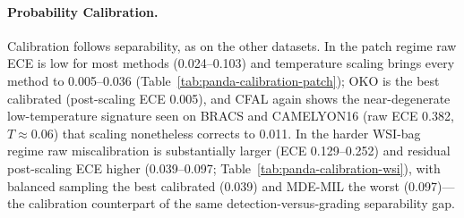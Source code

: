 \documentclass[11pt]{article}
\begin{document}
\begin{table}[ht]
  \centering
  \caption{PANDA native WSI-bag test results (slide-level six-class ISUP grading) for validation-selected configurations, mean $\pm$ standard deviation across patient-disjoint seeds.}
  \label{tab:panda-wsi-results}
\end{table}

\paragraph{Probability Calibration.}
Calibration follows separability, as on the other datasets. In the patch regime raw ECE is low for most methods (\num{0.024}--\num{0.103}) and temperature scaling brings every method to \num{0.005}--\num{0.036} (Table~\ref{tab:panda-calibration-patch}); OKO is the best calibrated (post-scaling ECE \num{0.005}), and CFAL again shows the near-degenerate low-temperature signature seen on BRACS and CAMELYON16 (raw ECE \num{0.382}, $T\approx\num{0.06}$) that scaling nonetheless corrects to \num{0.011}. In the harder WSI-bag regime raw miscalibration is substantially larger (ECE \num{0.129}--\num{0.252}) and residual post-scaling ECE higher (\num{0.039}--\num{0.097}; Table~\ref{tab:panda-calibration-wsi}), with balanced sampling the best calibrated (\num{0.039}) and MDE-MIL the worst (\num{0.097})---the calibration counterpart of the same detection-versus-grading separability gap.
\begin{table}[ht]
  \centering
  \caption{PANDA native patch-feature calibration: ECE before (raw) and after (TS) temperature scaling, with the fitted temperature $T$, mean $\pm$ standard deviation across seeds.}
  \label{tab:panda-calibration-patch}
\end{table}
\end{document}
